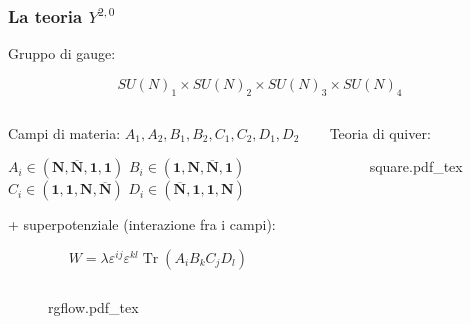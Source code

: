 \documentclass[aspectratio=43,mathserif]{beamer}
\newcommand{\rrep}[1]{\mathbf{#1}}
\newcommand{\cjrep}[1]{\overline{\rrep{#1} }}
\newcommand{\tr}{\operatorname{Tr}}
\begin{document}
\begin{frame}
	\frametitle{La teoria $Y^{2,0}$}
	Gruppo di gauge:\vspace{-10pt}

	\begin{equation}
		SU(N)_1\times SU(N)_2 \times SU(N)_3 \times SU(N)_4
		\label{}
	\end{equation}

	\begin{columns}
		\begin{column}{0.75\textwidth}

	Campi di materia: $A_1, A_2, B_1, B_2, C_1, C_2, D_1, D_2$

	\vspace{10pt}

	$A_i \in (\rrep N, \cjrep N, \rrep 1, \rrep 1)$ \quad $B_i \in (\rrep 1, \rrep N , \cjrep N, \rrep 1) $\\
	$C_i \in (\rrep 1, \rrep 1, \rrep N, \cjrep N)$ \quad $D_i \in (\cjrep N, \rrep 1, \rrep 1, \rrep N )$\\

	\vspace{10pt}

	+ superpotenziale (interazione fra i campi):

	\begin{equation}
		W = \lambda \varepsilon^{ij} \varepsilon^{kl} \tr(A_i B_k C_j D_l)
		\label{}
	\end{equation}

		\end{column}
		\begin{column}{0.25\textwidth}
	\vfill Teoria di quiver: 
	\begin{figure}[h!]\centering
		\def\svgscale{0.26}
		{square.pdf_tex}
	\end{figure}


	\end{column}
\end{columns}

\vspace{10pt}
\vfill

	\begin{figure}[h!]\centering
		\def\svgscale{0.45}
		{rgflow.pdf_tex}
	\end{figure}



\end{frame}
\end{document}
